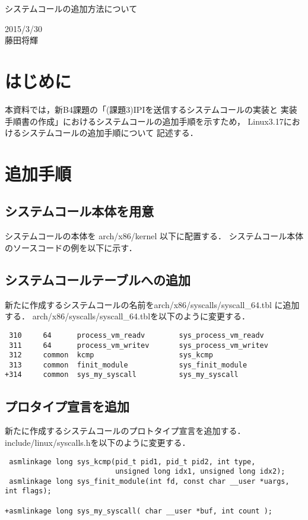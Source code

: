 \documentclass[12pt]{jsarticle}
\begin{document}

\begin{center}
{\LARGE システムコールの追加方法について}
\end{center}

\begin{flushright}
  2015/3/30\\
  藤田将輝
\end{flushright}
\section{はじめに}
本資料では，新B4課題の「(課題3)IPIを送信するシステムコールの実装と
実装手順書の作成」におけるシステムコールの追加手順を示すため，
Linux3.17におけるシステムコールの追加手順について
記述する．
\section{追加手順}\label{interrupt_handler}
\subsection{システムコール本体を用意}
システムコールの本体を arch/x86/kernel 以下に配置する．
システムコール本体のソースコードの例を以下に示す．
\subsection{システムコールテーブルへの追加}
新たに作成するシステムコールの名前をarch/x86/syscalls/syscall\_64.tbl
に追加する．
arch/x86/syscalls/syscall\_64.tblを以下のように変更する．
\begin{verbatim}
 310     64      process_vm_readv        sys_process_vm_readv
 311     64      process_vm_writev       sys_process_vm_writev
 312     common  kcmp                    sys_kcmp
 313     common  finit_module            sys_finit_module
+314     common  sys_my_syscall          sys_my_syscall
\end{verbatim}
\subsection{プロタイプ宣言を追加}
新たに作成するシステムコールのプロトタイプ宣言を追加する．
include/linux/syscalls.hを以下のように変更する．
\begin{verbatim}
 asmlinkage long sys_kcmp(pid_t pid1, pid_t pid2, int type,
                          unsigned long idx1, unsigned long idx2);
 asmlinkage long sys_finit_module(int fd, const char __user *uargs, int flags);
 
+asmlinkage long sys_my_syscall( char __user *buf, int count );
\end{verbatim}
\end{document}
